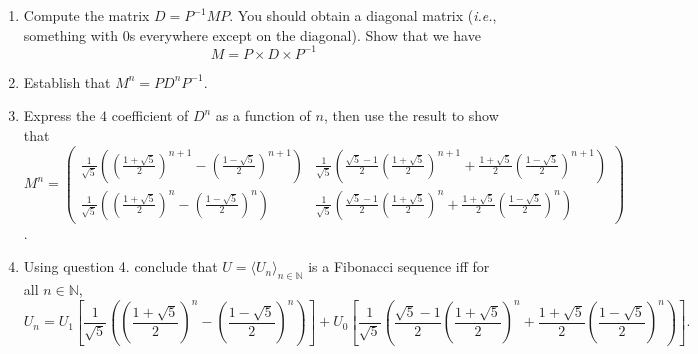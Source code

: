 \documentclass{article}
\begin{document}
\begin{enumerate}
\item Compute the matrix $D = P^{-1} M P$. You should obtain a diagonal matrix (\emph{i.e.}, something with $0$s everywhere except on the diagonal). Show that we have \[ M = P \times D \times P^{-1}\]
\item Establish that $M^n = P D^n P^{-1}$.
\item Express the $4$ coefficient of $D^n$ as a function of $n$, then use the result to show that \[ M^n = \begin{pmatrix} \frac{1}{\sqrt{5}}\left ( (\frac{1+\sqrt{5}}{2})^{n+1} - (\frac{1-\sqrt{5}}{2})^{n+1} \right ) & \frac{1}{\sqrt{5}} \left ( \frac{\sqrt{5} - 1}{2} (\frac{1+\sqrt{5}}{2})^{n+1} + \frac{1+\sqrt{5}}{2} (\frac{1-\sqrt{5}}{2})^{n+1}    \right ) \\ \frac{1}{\sqrt{5}}\left ( (\frac{1+\sqrt{5}}{2})^{n} - (\frac{1-\sqrt{5}}{2})^{n} \right ) & \frac{1}{\sqrt{5}} \left ( \frac{\sqrt{5} - 1}{2} (\frac{1+\sqrt{5}}{2})^{n} + \frac{1+\sqrt{5}}{2} (\frac{1-\sqrt{5}}{2})^{n}    \right )    \end{pmatrix} \].
\item Using question 4. conclude that $U = \langle U_n \rangle_{n \in \mathbb{N}}$ is a Fibonacci sequence iff for all $n \in \mathbb{N}$,
  \[ U_n =  U_1 \left [ \frac{1}{\sqrt{5}}\left ( \left (\frac{1+\sqrt{5}}{2} \right )^{n} - \left (\frac{1-\sqrt{5}}{2} \right )^{n} \right ) \right ] + U_0 \left [ \frac{1}{\sqrt{5}} \left ( \frac{\sqrt{5} - 1}{2} \left (\frac{1+\sqrt{5}}{2} \right )^{n} + \frac{1+\sqrt{5}}{2} \left (\frac{1-\sqrt{5}}{2} \right )^{n}    \right )  \right ].  \]
\end{enumerate}
\end{document}
